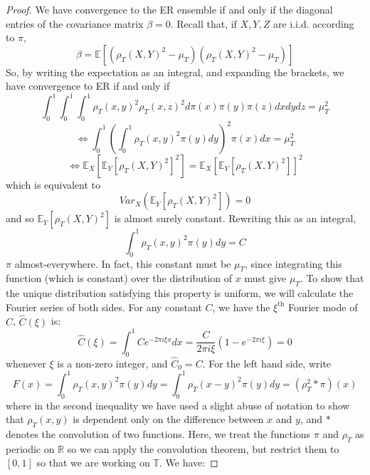 \documentclass[10pt,a4paper]{amsart}
\begin{document}
\begin{proof}
    We have convergence to the ER ensemble if and only if the diagonal entries of the covariance matrix $\beta = 0$. Recall that, if $X,Y,Z$ are i.i.d. according to $\pi$,
    \begin{equation}
        \beta = \mathbb{E}[(\rho_T(X,Y)^2-\mu_T)(\rho_T(X,Y)^2-\mu_T)]
    \end{equation}
    So, by writing the expectation as an integral, and expanding the brackets, we have convergence to ER if and only if
    \begin{equation}
            \int_0^1\int_0^1\int_0^1\rho_T(x,y)^2\rho_T(x,z)^2 d\pi(x)\pi(y)\pi(z)dxdydz = \mu_T^2
    \end{equation}
    \begin{equation}
        \iff \int_0^1\left(\int_0^1 \rho_T(x,y)^2\pi(y)dy\right)^2\pi(x)dx = \mu_T^2
    \end{equation}
    \begin{equation}
        \iff \mathbb{E}_X[\mathbb{E}_Y[\rho_T(X,Y)^2]^2] = \mathbb{E}_X[\mathbb{E}_Y[\rho_T(X,Y)^2]]^2
    \end{equation}
    which is equivalent to
    \begin{equation}
        Var_X(\mathbb{E}_Y[\rho_T(X,Y)^2]) = 0
    \end{equation}
    and so $\mathbb{E}_Y[\rho_T(X,Y)^2]$ is almost surely constant. Rewriting this as an integral,
    \begin{equation}
        \int_0^1 \rho_T(x,y)^2\pi(y)dy = C
    \end{equation}
    $\pi$ almost-everywhere. In fact, this constant must be $\mu_T$, since integrating this function (which is constant) over the distribution of $x$ must give $\mu_T$. To show that the unique distribution satisfying this property is uniform, we will calculate the Fourier series of both sides. For any constant $C$, we have the $\xi^{\text{th}}$ Fourier mode of $C$, $\hat{C}(\xi)$ is:
    \begin{equation}
        \hat{C}(\xi) = \int_0^1 Ce^{-2\pi i \xi x}dx = \frac{C}{2\pi i \xi} \left(1-e^{-2\pi i\xi}\right) = 0
    \end{equation}
    whenever $\xi$ is a non-zero integer, and $\hat{C}_0 = C$. For the left hand side, write
    \begin{equation}
        F(x) = \int_0^1\rho_T(x,y)^2\pi(y)dy = \int_0^1 \rho_T(x-y)^2\pi(y)dy = (\rho_T^2 \ast \pi)(x) 
    \end{equation}
    where in the second inequality we have used a slight abuse of notation to show that $\rho_T(x,y)$ is dependent only on the difference between $x$ and $y$, and $\ast$ denotes the convolution of two functions. Here, we treat the functions $\pi$ and $\rho_T$ as periodic on $\mathbb{R}$ so we can apply the convolution theorem, but restrict them to $[0,1]$ so that we are working on $\mathbb{T}$. We have:

\end{proof}
\end{document}

